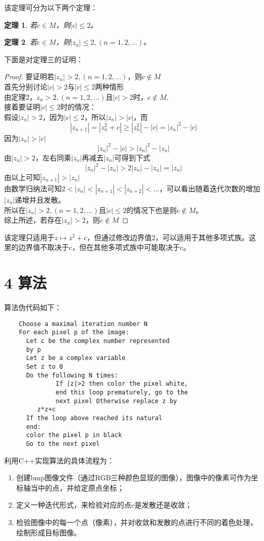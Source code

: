 \documentclass[twocolumn]{ctexart}
\newtheorem{thm}{定理}
\begin{document}
	该定理可分为以下两个定理：
	\begin{thm} 
		若$ c\in M $，则$ |c|\leq 2 $。
	\end{thm}
	\begin{thm} 
		若$ c\in M $，则$ |z_{n}|\leq 2,(n=1,2,\dots) $。
	\end{thm}
	下面是对定理三的证明：
	\begin{proof}
		要证明若$ |z_{n}|>2,(n=1,2,\dots) $，则$ c\notin M $\\
		首先分别讨论$ |c|>2 $与$ |c|\leq 2 $两种情形\\
		由定理2，$ z_{n}>2,(n=1,2,\dots) $且$ |c|>2 $时，$ c\notin M $.\\
		接着要证明$ |c|\leq 2 $时的情况：\\
		假设$ |z_{n}|>2 $，因为$ |c|\leq 2 $，所以$ |z_{n}|>|c| $，而\\
		\[|z_{n+1}|=|z_{n}^{2}+c|\geq|z_{n}^{2}|-|c|=|z_{n}|^{2}-|c|\]
		因为$ |z_{n}|>|c| $\\
		\[|z_{n}|^{2}-|c|>|z_{n}|^{2}-|z_{n}|\]
		由$ |z_{n}|>2 $，左右同乘$ |z_{n}| $再减去$ |z_{n}| $可得到下式\\
		\[|z_{n}|^{2}-|z_{n}|>2|z_{n}|-|z_{n}|=|z_{n}|\]
		由以上可知$ |z_{n+1}|>|z_{n}| $\\
		由数学归纳法可知$ 2<|z_{n}|<|z_{n+1}|<|z_{n+2}|<\dots $，可以看出随着迭代次数的增加$ |z_{n}| $递增并且发散。\\
		所以在$ |z_{n}|>2,(n=1,2,\dots) $且$ |c|\leq 2 $的情况下也是则$ c\notin M $。\\
		综上所述，若存在$ |z_{n}|>2 $，则$ c\notin M $
	\end{proof}
	该定理只适用于$ z\mapsto z^{2}+c $，但通过修改边界值2，可以适用于其他多项式族。这里的边界值不取决于c，但在其他多项式族中可能取决于c\cite{weisstein2002mandelbrot}。

	\section*{4 算法}
	算法伪代码如下：
	\begin{verbatim}
	Choose a maximal iteration number N
	For each pixel p of the image:
	  Let c be the complex number represented 
	  by p
	  Let z be a complex variable
	  Set z to 0
	  Do the following N times:    
		  	  If |z|>2 then color the pixel white, 
		  	  end this loop prematurely, go to the
		  	  next pixel Otherwise replace z by 
	     z*z+c
	  If the loop above reached its natural
	  end: 
	  color the pixel p in black
	  Go to the next pixel
	\end{verbatim}
	利用C++实现算法的具体流程为：
	\begin{enumerate}[(1)] 
		\item 创建bmp图像文件（通过RGB三种颜色显现的图像），图像中的像素可作为坐标轴当中的点，并给定原点坐标；
		\item 定义一种迭代形式，来检验对应的点c是发散还是收敛；
		\item 检验图像中的每一个点（像素），并对收敛和发散的点进行不同的着色处理，绘制形成目标图像。
	\end{enumerate}
	
\end{document}
